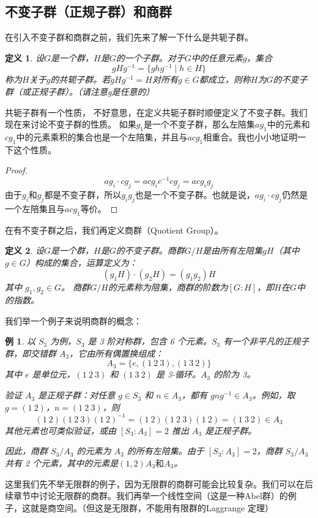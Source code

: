 \documentclass{ctexart}%
\newtheorem{definition}{定义}
\newtheorem{example}{例}
\begin{document}
\subsection{不变子群（正规子群）和商群}
在引入不变子群和商群之前，我们先来了解一下什么是共轭子群。
\begin{definition}
    设$G$是一个群，$H$是$G$的一个子群。对于$G$中的任意元素$g$，集合
    \[
        gHg^{-1} = \{ghg^{-1} \mid h \in H\}
    \]
    称为$H$关于$g$的共轭子群。若$gHg^{-1} = H$对所有$g \in G$都成立，则称$H$为$G$的不变子群（或正规子群）。（请注意g是任意的）
\end{definition}
共轭子群有一个性质，
不好意思，在定义共轭子群时顺便定义了不变子群。我们现在来讨论不变子群的性质。
如果$g_1$是一个不变子群，那么左陪集$ag_1$中的元素和$cg_1$中的元素乘积的集合也是一个左陪集，并且与$acg_1$相重合。我也小小地证明一下这个性质。
\begin{proof}   
    \[ag_i \cdot cg_j = acg_ic^{-1}cg_j = acg_ig_j\]
    由于$g_i$和$g_j$都是不变子群，所以$g_ig_j$也是一个不变子群。也就是说，$ag_i \cdot cg_j$仍然是一个左陪集且与$acg_1$等价。
\end{proof}
在有不变子群之后，我们再定义商群（Quotient Group）。
\begin{definition}
    设$G$是一个群，$H$是$G$的不变子群。商群$G/H$是由所有左陪集$gH$（其中$g \in G$）构成的集合，运算定义为：
    \[
        (g_1H) \cdot (g_2H) = (g_1 g_2) H
    \]
    其中 $g_1, g_2 \in G$。
    商群$G/H$的元素称为陪集，商群的阶数为$[G : H]$，即$H$在$G$中的指数。
\end{definition}
我们举一个例子来说明商群的概念：
\begin{example} 
    以 $S_3$ 为例，$S_3$ 是 3 阶对称群，包含 6 个元素。$S_3$ 有一个非平凡的正规子群，即交错群 $A_3$，它由所有偶置换组成：
    \[
        A_3 = \{ e, (1\ 2\ 3), (1\ 3\ 2) \}
    \]
    其中 $e$ 是单位元，$(1\ 2\ 3)$ 和 $(1\ 3\ 2)$ 是 3-循环。$A_3$ 的阶为 3。

    验证 $A_3$ 是正规子群：对任意 $g \in S_3$ 和 $n \in A_3$，都有 $g n g^{-1} \in A_3$。例如，取 $g = (1\ 2)$，$n = (1\ 2\ 3)$，则
    \[
        (1\ 2)(1\ 2\ 3)(1\ 2)^{-1} = (1\ 2)(1\ 2\ 3)(1\ 2) = (1\ 3\ 2) \in A_3
    \]
    其他元素也可类似验证，或由 $[S_3 : A_3] = 2$ 推出 $A_3$ 是正规子群。

    因此，商群 $S_3 / A_3$ 的元素为 $A_3$ 的所有左陪集。由于 $[S_3 : A_3] = 2$，商群 $S_3 / A_3$ 共有 2 个元素，其中的元素是$(1,2)A_3\text{和}A_3$。
\end{example}
这里我们先不举无限群的例子，因为无限群的商群可能会比较复杂。我们可以在后续章节中讨论无限群的商群。我们再举一个线性空间（这是一种Abel群）的例子，这就是商空间。（但这是无限群，不能用有限群的Laggrange 定理）
\end{document}
